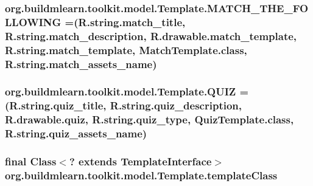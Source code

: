 \subsubsection[{\texorpdfstring{M\+A\+T\+C\+H\+\_\+\+T\+H\+E\+\_\+\+F\+O\+L\+L\+O\+W\+I\+NG}{MATCH_THE_FOLLOWING}}]{\setlength{\rightskip}{0pt plus 5cm}org.\+buildmlearn.\+toolkit.\+model.\+Template.\+M\+A\+T\+C\+H\+\_\+\+T\+H\+E\+\_\+\+F\+O\+L\+L\+O\+W\+I\+NG =(R.\+string.\+match\+\_\+title, R.\+string.\+match\+\_\+description, R.\+drawable.\+match\+\_\+template, R.\+string.\+match\+\_\+template, Match\+Template.\+class, R.\+string.\+match\+\_\+assets\+\_\+name)}\hypertarget{enumorg_1_1buildmlearn_1_1toolkit_1_1model_1_1Template_a813519a1b5f6ac6fc392396d57698a12}{}\label{enumorg_1_1buildmlearn_1_1toolkit_1_1model_1_1Template_a813519a1b5f6ac6fc392396d57698a12}
\subsubsection[{\texorpdfstring{Q\+U\+IZ}{QUIZ}}]{\setlength{\rightskip}{0pt plus 5cm}org.\+buildmlearn.\+toolkit.\+model.\+Template.\+Q\+U\+IZ =(R.\+string.\+quiz\+\_\+title, R.\+string.\+quiz\+\_\+description, R.\+drawable.\+quiz, R.\+string.\+quiz\+\_\+type, Quiz\+Template.\+class, R.\+string.\+quiz\+\_\+assets\+\_\+name)}\hypertarget{enumorg_1_1buildmlearn_1_1toolkit_1_1model_1_1Template_aee37e120e37544ed8fff5341f9012fee}{}\label{enumorg_1_1buildmlearn_1_1toolkit_1_1model_1_1Template_aee37e120e37544ed8fff5341f9012fee}
\subsubsection[{\texorpdfstring{template\+Class}{templateClass}}]{\setlength{\rightskip}{0pt plus 5cm}final Class$<$? extends {\bf Template\+Interface}$>$ org.\+buildmlearn.\+toolkit.\+model.\+Template.\+template\+Class\hspace{0.3cm}{\ttfamily [private]}}\hypertarget{enumorg_1_1buildmlearn_1_1toolkit_1_1model_1_1Template_a6a200b7fbb36356e5afe60983256bd68}{}\label{enumorg_1_1buildmlearn_1_1toolkit_1_1model_1_1Template_a6a200b7fbb36356e5afe60983256bd68}
